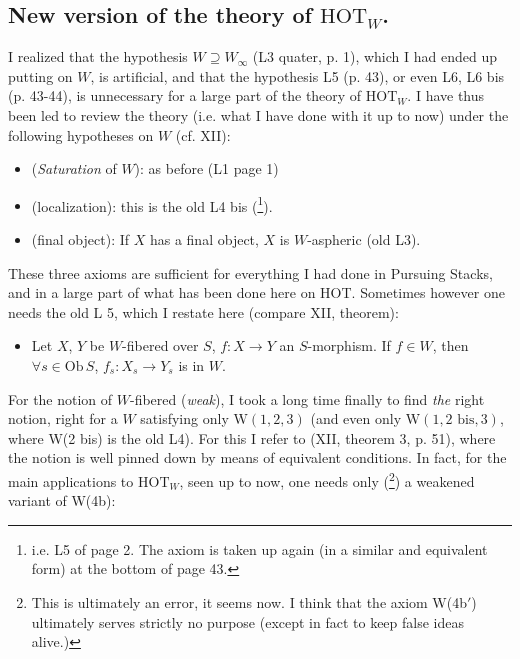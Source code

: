 \documentclass[11pt]{article}
\newcommand{\printedpage}[1]{\marginpar{\footnotesize p.~#1}}
\newcommand{\msp}[1]{\marginpar{\footnotesize [#1]}}
\begin{document}
\setcounter{footnote}{81}

\printedpage{104}

\msp{page 171}

\subsection*{New version of the theory of $\mathrm{HOT}_W$.}

I realized that the hypothesis $W \supseteq W_\infty$ (L3 quater, p. 1), which I had ended up putting on $W$, is artificial, and that the hypothesis L5 (p. 43), or even L6, L6 bis (p. 43-44), is unnecessary for a large part of the theory of $\mathrm{HOT}_W$. I have thus been led to review the theory (i.e. what I have done with it up to now) under the following hypotheses on $W$ (cf. XII):

\begin{itemize}[leftmargin=4em]
\item[W(1)] (\textit{Saturation} of $W$): as before (L1 page 1)
\item[W(2)] (localization): this is the old L4 bis (\footnote{i.e. L5 of page 2. The axiom is taken up again (in a similar and equivalent form) at the bottom of page 43.}).
\item[W(3)] (final object): If $X$ has a final object, $X$ is $W$-aspheric (old L3).
\end{itemize}

These three axioms are sufficient for everything I had done in Pursuing Stacks, and in a large part of what has been done here on HOT. Sometimes however one needs the old L 5, which I restate here (compare XII, theorem): %

\begin{itemize}[leftmargin=4em]
\item[W(4b)] Let $X$, $Y$ be $W$-fibered over $S$, $f : X \longrightarrow Y$ an $S$-morphism. If $f \in W$, then $\forall s \in \mathrm{Ob}\, S$, $f_s : X_s \longrightarrow Y_s$ is in $W$.
\end{itemize}

For the notion of $W$-fibered (\textit{weak}), I took a long time finally to find \textit{the} right notion, right for a $W$ satisfying only $\mathrm{W}(1,2,3)$ (and even only $\mathrm{W}(1, 2 \text{ bis}, 3)$, where W(2 bis) is the old L4). For this I refer to (XII, theorem 3, p. 51), where the notion is well pinned down by means of equivalent conditions. In fact, for the main applications to $\mathrm{HOT}_W$, seen up to now, one needs only (\footnote{This is ultimately an error, it seems now. I think that the axiom W(4b$'$) ultimately serves strictly no purpose (except in fact to keep false ideas alive.)}) a weakened variant of W(4b):
\end{document}
